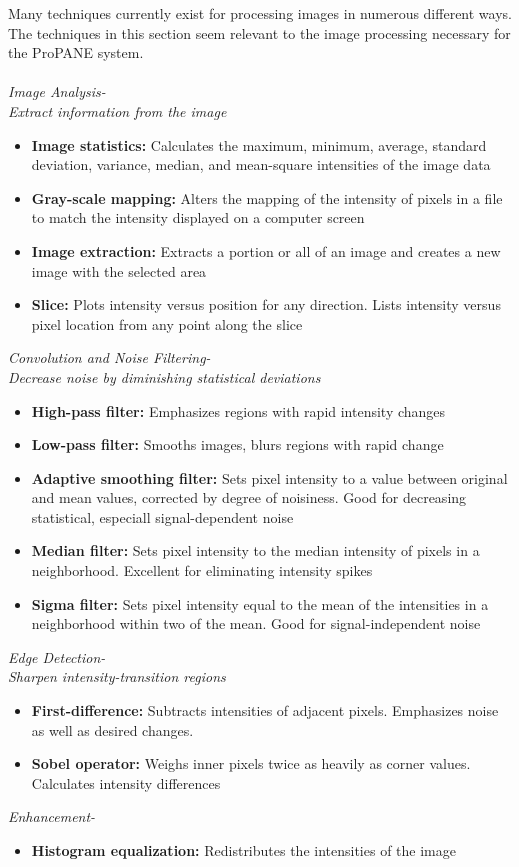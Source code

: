 \documentclass[]{article}
\begin{document}
\noindent Many techniques currently exist for processing images in numerous different ways.  The techniques in this section seem relevant to the image processing necessary for the ProPANE system. \cite{ndt} \\ \\
{\sl Image Analysis- \\ \indent Extract information from the image} 
			\begin{itemize} 
				\item{\textbf{Image statistics:}} Calculates the maximum, minimum, average, standard deviation, variance, median, and mean-square intensities of the image data					
				\item{\textbf{Gray-scale mapping:}} Alters the mapping of the intensity of pixels in a file to match the intensity displayed on a computer screen 
				\item{\textbf{Image extraction:}} Extracts a portion or all of an image and creates a new image with the selected area 
				\item{\textbf{Slice:}} Plots intensity versus position for any direction. Lists intensity versus pixel location from any point along the slice
			\end{itemize} 
{\sl Convolution and Noise Filtering- \\ \indent Decrease noise by diminishing statistical deviations}
			\begin{itemize}
				\item{\textbf{High-pass filter:}} Emphasizes regions with rapid intensity changes
				\item{\textbf{Low-pass filter:}} Smooths images, blurs regions with rapid change
				\item{\textbf{Adaptive smoothing filter:}} Sets pixel intensity to a value between original and mean values, corrected by degree of noisiness. Good for decreasing statistical, especiall signal-dependent noise
				\item{\textbf{Median filter:}} Sets pixel intensity to the median intensity of pixels in a neighborhood. Excellent for eliminating intensity spikes
				\item{\textbf{Sigma filter:}} Sets pixel intensity equal to the mean of the intensities in a neighborhood within two of the mean.  Good for signal-independent noise
			\end{itemize}
{\sl Edge Detection- \\ \indent Sharpen intensity-transition regions}	
			\begin{itemize}
				\item{\textbf{First-difference:}} Subtracts intensities of adjacent pixels.  Emphasizes noise as well as desired changes. 
				\item{\textbf{Sobel operator:}} Weighs inner pixels twice as heavily as corner values.  Calculates intensity differences
			\end{itemize}
{\sl Enhancement- }
			\begin{itemize}
				\item{\textbf{Histogram equalization:}} Redistributes the intensities of the image
			\end{itemize}
\end{document}
